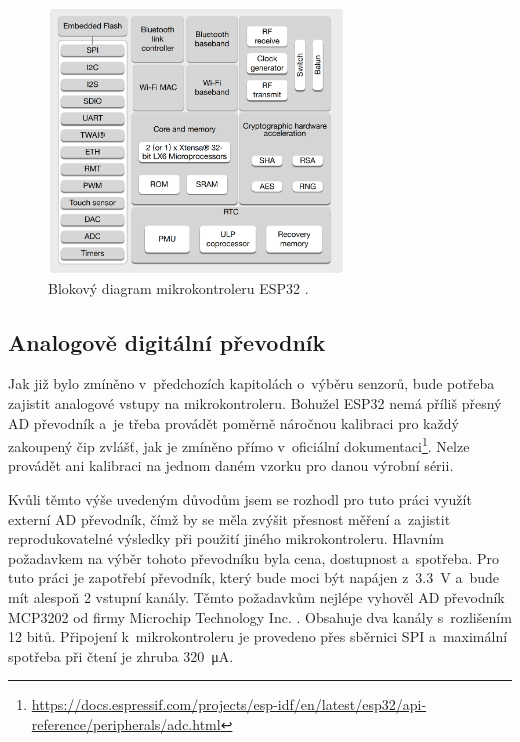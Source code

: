 \begin{figure}
    \centering
    \includegraphics[width=0.7\textwidth]{obrazky/esp32_internalStructure.png}
    \caption[Blokový diagram mikrokontroleru ESP32.]{Blokový diagram mikrokontroleru ESP32 \cite{dat_ESP32-WROOM}.}
    \label{fig_ESP32InternalStructure}
\end{figure}

\subsection{Analogově digitální převodník}

Jak již bylo zmíněno v~předchozích kapitolách o~výběru senzorů, bude potřeba zajistit analogové vstupy na mikrokontroleru. Bohužel ESP32 nemá příliš přesný AD převodník a~je třeba provádět poměrně náročnou kalibraci pro každý zakoupený čip zvlášť, jak je zmíněno přímo v~oficiální dokumentaci\footnote{\url{https://docs.espressif.com/projects/esp-idf/en/latest/esp32/api-reference/peripherals/adc.html}}. Nelze provádět ani kalibraci na jednom daném vzorku pro danou výrobní sérii.

Kvůli těmto výše uvedeným důvodům jsem se rozhodl pro tuto práci využít externí AD převodník, čímž by se měla zvýšit přesnost měření a~zajistit reprodukovatelné výsledky při použití jiného mikrokontroleru. Hlavním požadavkem na výběr tohoto převodníku byla cena, dostupnost a~spotřeba. Pro tuto práci je zapotřebí převodník, který bude moci být napájen z~\SI{3,3}{\volt} a~bude mít alespoň 2 vstupní kanály. Těmto požadavkům nejlépe vyhověl AD převodník MCP3202 od firmy Microchip Technology Inc. \cite{dat_MCP3202}. Obsahuje dva kanály s~rozlišením 12 bitů. Připojení k~mikrokontroleru je provedeno přes sběrnici SPI a~maximální spotřeba při čtení je zhruba \SI{320}{\micro\ampere}.


